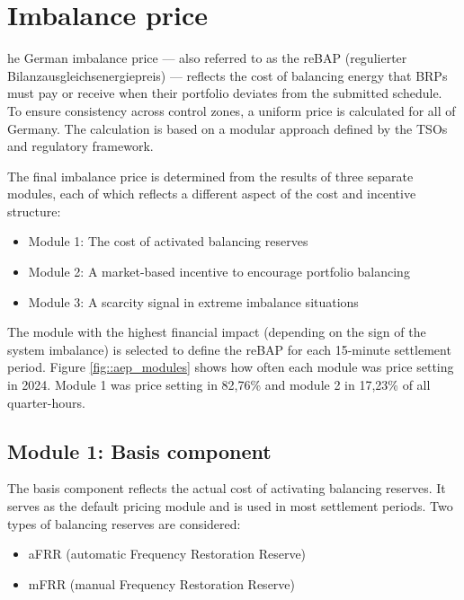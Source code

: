 \documentclass[class=scrbook, crop=false]{standalone}
\begin{document}



\section{Imbalance price}
\label{Section::Imbalance_Price}
he German imbalance price — also referred to as the reBAP (regulierter Bilanzausgleichsenergiepreis) — reflects the cost of balancing energy that BRPs must pay or receive when their portfolio deviates from the submitted schedule.
To ensure consistency across control zones, a uniform price is calculated for all of Germany. The calculation is based on a modular approach defined by the TSOs and regulatory framework.

The final imbalance price is determined from the results of three separate modules, each of which reflects a different aspect of the cost and incentive structure:
\begin{itemize}
\item Module 1: The cost of activated balancing reserves
\item Module 2: A market-based incentive to encourage portfolio balancing
\item Module 3: A scarcity signal in extreme imbalance situations
\end{itemize}
The module with the highest financial impact (depending on the sign of the system imbalance) is selected to define the reBAP for each 15-minute settlement period. Figure \ref{fig::aep_modules} shows how often each module was price setting in 2024. Module 1 was price setting in 82,76\% and module 2 in 17,23\% of all quarter-hours.

\subsection{Module 1: Basis component}
The basis component reflects the actual cost of activating balancing reserves. It serves as the default pricing module and is used in most settlement periods.
Two types of balancing reserves are considered:
\begin{itemize}
\item aFRR (automatic Frequency Restoration Reserve)
\item mFRR (manual Frequency Restoration Reserve)
\end{itemize}
\end{document}
